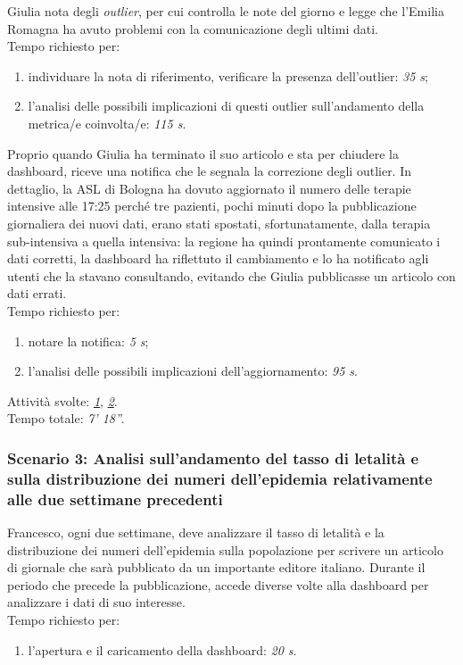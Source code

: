 Giulia nota degli \textit{outlier}, per cui controlla le note del giorno e legge che l'Emilia Romagna ha avuto problemi con la comunicazione degli ultimi dati.\\
Tempo richiesto per:
\begin{enumerate}
    \item individuare la nota di riferimento, verificare la presenza dell'outlier: \textit{35 s};
    \item l'analisi delle possibili implicazioni di questi outlier sull'andamento della metrica/e coinvolta/e: \textit{115 s}.
\end{enumerate}\noindent

Proprio quando Giulia ha terminato il suo articolo e sta per chiudere la dashboard, riceve una notifica che le segnala la correzione degli outlier. In dettaglio, la ASL di Bologna ha dovuto aggiornato il numero delle terapie intensive alle 17:25 perché tre pazienti, pochi minuti dopo la pubblicazione giornaliera dei nuovi dati, erano stati spostati, sfortunatamente, dalla terapia sub-intensiva a quella intensiva: la regione ha quindi prontamente comunicato i dati corretti, la dashboard ha riflettuto il cambiamento e lo ha notificato agli utenti che la stavano consultando, evitando che Giulia pubblicasse un articolo con dati errati.\\
Tempo richiesto per:
\begin{enumerate}
    \item notare la notifica: \textit{5 s};
    \item l'analisi delle possibili implicazioni dell'aggiornamento: \textit{95 s}.
\end{enumerate}\noindent

Attività svolte: \hyperref[itm:1]{\textit{1}}, \hyperref[itm:2]{\textit{2}}.\\  
Tempo totale: \textit{7' 18''}. 

\subsubsection{Scenario 3: Analisi sull'andamento del tasso di letalità e sulla distribuzione dei numeri dell'epidemia relativamente alle due settimane precedenti}
Francesco, ogni due settimane, deve analizzare il tasso di letalità e la distribuzione dei numeri dell’epidemia sulla popolazione per scrivere un articolo di giornale che sarà pubblicato da un importante editore italiano. Durante il periodo che precede la pubblicazione, accede diverse volte alla dashboard per analizzare i dati di suo interesse.\\
Tempo richiesto per:
\begin{enumerate}
    \item l'apertura e il caricamento della dashboard: \textit{20 s}.
\end{enumerate}\noindent

